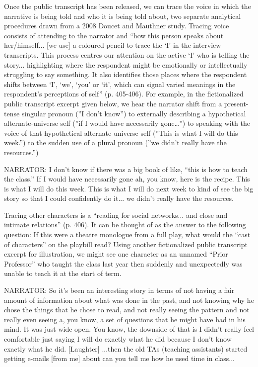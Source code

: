 Once the public transcript has been released, we can trace the voice in which the narrative is being told and who it is being told about, two separate analytical procedures drawn from a 2008 Doucet and Mauthner study. Tracing voice consists of attending to the narrator and “how this person speaks about her/himself... [we use] a coloured pencil to trace the ‘I’ in the interview transcripts. This process centres our attention on the active ‘I’ who is telling the story... highlighting where the respondent might be emotionally or intellectually struggling to say something. It also identifies those places where the respondent shifts between ‘I’, ‘we’, ‘you’ or ‘it’, which can signal varied meanings in the respondent’s perceptions of self” (p. 405-406).
For example, in the fictionalized public transcript excerpt given below, we hear the narrator shift from a present-tense singular pronoun (”I don’t know”) to externally describing a hypothetical alternate-universe self (”if I would have necessarily gone…”) to speaking with the voice of that hypothetical alternate-universe self (”This is what I will do this week.”) to the sudden use of a plural pronoun (”we didn’t really have the resources.”)

NARRATOR: I don't know if there was a big book of like, “this is how to teach the class.” If I would have necessarily gone ah, you know, here is the recipe. This is what I will do this week. This is what I will do next week to kind of see the big story so that I could confidently do it... we didn't really have the resources.

Tracing other characters is a “reading for social networks... and close and intimate relations” (p. 406). It can be thought of as the answer to the following question: If this were a theatre monologue from a full play, what would the “cast of characters” on the playbill read? Using another fictionalized public transcript excerpt for illustration, we might see one character as an unnamed “Prior Professor” who taught the class last year then suddenly and unexpectedly was unable to teach it at the start of term.

NARRATOR: So it's been an interesting story in terms of not having a fair amount of information about what was done in the past, and not knowing why he chose the things that he chose to read, and not really seeing the pattern and not really even seeing a, you know, a set of questions that he might have had in his mind. It was just wide open. You know, the downside of that is I didn't really feel comfortable just saying I will do exactly what he did because I don't know exactly what he did. [Laughter] ...then the old TAs (teaching assistants) started getting e-mails [from me] about can you tell me how he used time in class...

